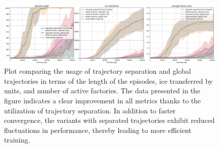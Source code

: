 \begin{figure}[htbp]
    \centering
    \includegraphics[width=0.95\linewidth]{images/results_hybrid/trajectory_separation/combined.png}
    \captionsetup{justification=justified, singlelinecheck=false, width=1\linewidth, labelfont=bf} 
    \caption[]{Plot comparing the usage of trajectory separation and global trajectories in terms of the length of the episodes, ice transferred by units, and number of active factories. The data presented in the figure indicates a clear improvement in all metrics thanks to the utilization of trajectory separation. In addition to faster convergence, the variants with separated trajectories exhibit reduced fluctuations in performance, thereby leading to more efficient training.}
    \label{fig:hybrid_results/trajectory_separation/combined}
\end{figure}

